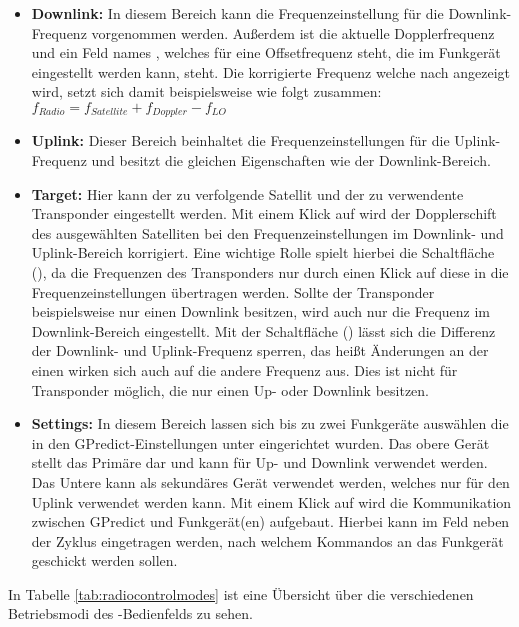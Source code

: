 \begin{itemize}
	\parskip0pt
	\item \textbf{Downlink:} In diesem Bereich kann die Frequenzeinstellung für die Downlink-Frequenz vorgenommen werden. Außerdem ist die aktuelle Dopplerfrequenz und ein Feld names , welches für eine Offsetfrequenz steht, die im Funkgerät eingestellt werden kann, steht. Die korrigierte Frequenz welche nach  angezeigt wird, setzt sich damit beispielsweise wie folgt zusammen: $f_{Radio} = f_{Satellite} + f_{Doppler} - f_{LO}$
	\item \textbf{Uplink:} Dieser Bereich beinhaltet die Frequenzeinstellungen für die Uplink-Frequenz und besitzt die gleichen Eigenschaften wie der Downlink-Bereich.
	\item \textbf{Target:} Hier kann der zu verfolgende Satellit und der zu verwendente Transponder eingestellt werden. Mit einem Klick auf  wird der Dopplerschift des ausgewählten Satelliten bei den Frequenzeinstellungen im Downlink- und Uplink-Bereich korrigiert. Eine wichtige Rolle spielt hierbei die Schaltfläche  (), da die Frequenzen des Transponders nur durch einen Klick auf diese in die Frequenzeinstellungen übertragen werden. Sollte der Transponder beispielsweise nur einen Downlink besitzen, wird auch nur die Frequenz im Downlink-Bereich eingestellt.\clearpage
	Mit der Schaltfläche  () lässt sich die Differenz der Downlink- und Uplink-Frequenz sperren, das heißt Änderungen an der einen wirken sich auch auf die andere Frequenz aus. Dies ist nicht für Transponder möglich, die nur einen Up- oder Downlink besitzen.
	\item \textbf{Settings:} In diesem Bereich lassen sich bis zu zwei Funkgeräte auswählen die in den GPredict-Einstellungen unter  eingerichtet wurden. Das obere Gerät stellt das Primäre dar und kann für Up- und Downlink verwendet werden. Das Untere kann als sekundäres Gerät verwendet werden, welches nur für den Uplink verwendet werden kann. Mit einem Klick auf  wird die Kommunikation zwischen GPredict und Funkgerät(en) aufgebaut. Hierbei kann im Feld neben  der Zyklus eingetragen werden, nach welchem Kommandos an das Funkgerät geschickt werden sollen.
\end{itemize}

In Tabelle \ref{tab:radiocontrolmodes} ist eine Übersicht über die verschiedenen Betriebsmodi des -Bedienfelds zu sehen.

